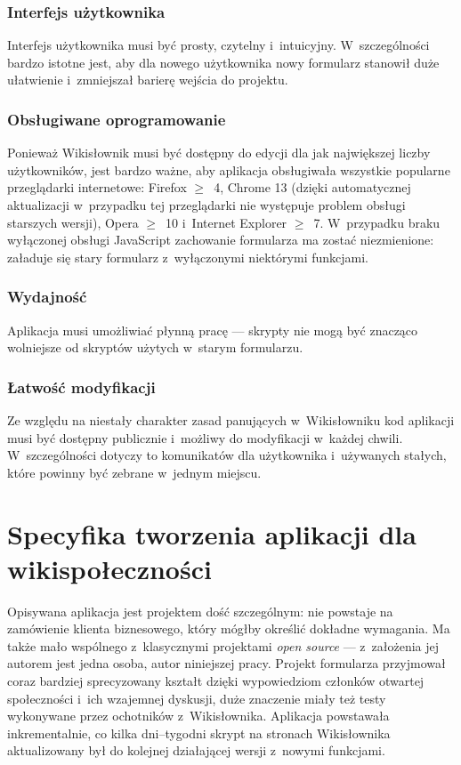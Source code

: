 \subsubsection{Interfejs użytkownika}
Interfejs użytkownika musi być prosty, czytelny i~intuicyjny. W~szczególności bardzo istotne jest, aby dla nowego użytkownika nowy formularz stanowił duże ułatwienie i~zmniejszał barierę wejścia do projektu.

\subsubsection{Obsługiwane oprogramowanie}
Ponieważ Wikisłownik musi być dostępny do edycji dla jak największej liczby użytkowników, jest bardzo ważne, aby aplikacja obsługiwała wszystkie popularne przeglądarki internetowe: Firefox $\geq$~4, Chrome 13 (dzięki automatycznej aktualizacji w~przypadku tej przeglądarki nie występuje problem obsługi starszych wersji), Opera $\geq$~10 i~Internet Explorer $\geq$~7. W~przypadku braku wyłączonej obsługi JavaScript zachowanie formularza ma zostać niezmienione: załaduje się stary formularz z~wyłączonymi niektórymi funkcjami.

\subsubsection{Wydajność}
Aplikacja musi umożliwiać płynną pracę --- skrypty nie mogą być znacząco wolniejsze od skryptów użytych w~starym formularzu.

\subsubsection{Łatwość modyfikacji}
Ze względu na niestały charakter zasad panujących w~Wikisłowniku kod aplikacji musi być dostępny publicznie i~możliwy do modyfikacji w~każdej chwili. W~szczególności dotyczy to komunikatów dla użytkownika i~używanych stałych, które powinny być zebrane w~jednym miejscu.

\section{Specyfika tworzenia aplikacji dla wikispołeczności}
\label{sec:spec}
Opisywana aplikacja jest projektem dość szczególnym: nie powstaje na zamówienie klienta biznesowego, który mógłby określić dokładne wymagania. Ma także mało wspólnego z~klasycznymi projektami \emph{open source} --- z~założenia jej autorem jest jedna osoba, autor niniejszej pracy. Projekt formularza przyjmował coraz bardziej sprecyzowany kształt dzięki wypowiedziom członków otwartej społeczności i~ich wzajemnej dyskusji, duże znaczenie miały też testy wykonywane przez ochotników z~Wikisłownika. Aplikacja powstawała inkrementalnie, co kilka dni--tygodni skrypt na stronach Wikisłownika aktualizowany był do kolejnej działającej wersji z~nowymi funkcjami.


